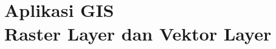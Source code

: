\documentclass{WileySix}
\begin{document}
\chapter[Raster Layer dan Vektor Layer]
{Aplikasi GIS\\ Raster Layer dan Vektor Layer}








\printindex
\end{document}

